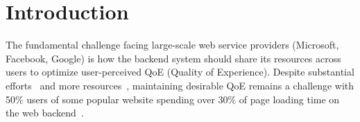 \section{Introduction}

\noindent The fundamental challenge facing large-scale web service providers (\eg Microsoft, Facebook, Google) is how the backend system should  share its resources across users to optimize user-perceived QoE (Quality of Experience). 
Despite substantial efforts~\cite{??,??,??} and more resources~\cite{??,??,??}, maintaining desirable QoE remains a challenge with 50\% users of some popular website spending over 30\% of page loading time on the web backend~\cite{mystery}.

